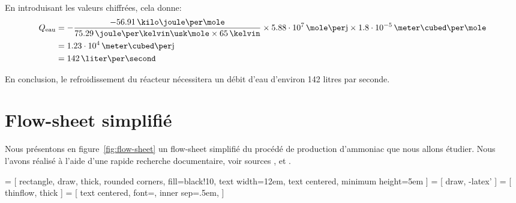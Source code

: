 \documentclass[a4paper,12pt]{article}
\begin{document}
En introduisant les valeurs chiffrées, cela donne:
\begin{align*}
    Q\ind{eau} &=
    -\frac{-56.91\,\kilo\joule\per\mole}{75.29\,\joule\per\kelvin\usk\mole
    \times 65\,\kelvin} \times 5.88\cdot10^7\,\mole\per\mbox{j}
    \times 1.8\cdot10^{-5}\,\meter\cubed\per\mole \\
    &= 1.23\cdot10^4\,\meter\cubed\per\mbox{j} \\
    &= 142\,\liter\per\second \\
\end{align*}

En conclusion, le refroidissement du réacteur nécessitera un débit d'eau
d'environ 142 litres par seconde.

\section{Flow-sheet simplifié}

Nous présentons en figure~\ref{fig:flow-sheet} un flow-sheet simplifié
du procédé de production d'ammoniac que nous allons étudier.
Nous l'avons réalisé à l'aide d'une rapide recherche documentaire,
voir sources \cite{process-patent}, \cite{epa} et \cite{contaminants}.

 = [
    rectangle, draw, thick, rounded corners, fill=black!10,
    text width=12em, text centered,
    minimum height=5em
]
 = [
    draw, -latex'
]
 = [
    thinflow, thick
]
 = [
    text centered,
    font=\footnotesize,
    inner sep=.5em,
]
\end{document}
